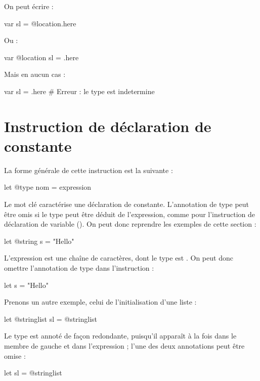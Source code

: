 On peut écrire :
\begin{galgascode}
var sl = @location.here
\end{galgascode}

Ou :
\begin{galgascode}
var @location sl = .here
\end{galgascode}

Mais en aucun cas :
\begin{galgascode}
var sl = .here # Erreur : le type est indetermine
\end{galgascode}





\section{Instruction de déclaration de constante}

La forme générale de cette instruction est la suivante :
\begin{galgascode}
let @type nom = expression
\end{galgascode}

Le mot clé  caractérise une déclaration de constante. L'annotation de type peut être omis si le type peut être déduit de l'expression, comme pour l'instruction de déclaration de variable (). On peut donc reprendre les exemples de cette section :
\begin{galgascode}
let @string s = "Hello"
\end{galgascode}

L'expression est une chaîne de caractères, dont le type est . On peut donc omettre l'annotation de type dans l'instruction :
\begin{galgascode}
let s = "Hello"
\end{galgascode}


Prenons un autre exemple, celui de l'initialisation d'une liste :
\begin{galgascode}
let @stringlist sl = @stringlist {}
\end{galgascode}

Le type est annoté de façon redondante, puisqu'il apparaît à la fois dans le membre de gauche et dans l'expression ; l'une des deux annotations peut être omise :
\begin{galgascode}
let sl = @stringlist {}
\end{galgascode}

